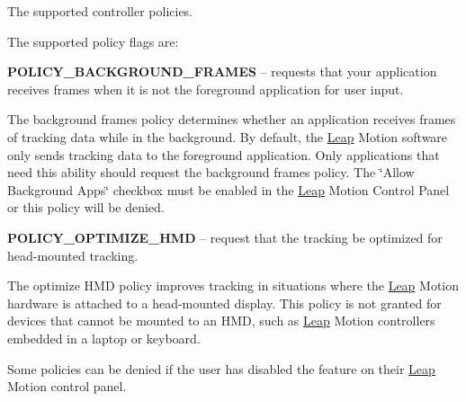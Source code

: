 The supported controller policies. 

The supported policy flags are\+:

{\bfseries{P\+O\+L\+I\+C\+Y\+\_\+\+B\+A\+C\+K\+G\+R\+O\+U\+N\+D\+\_\+\+F\+R\+A\+M\+ES}} -- requests that your application receives frames when it is not the foreground application for user input.

The background frames policy determines whether an application receives frames of tracking data while in the background. By default, the \mbox{\hyperlink{namespace_leap}{Leap}} Motion software only sends tracking data to the foreground application. Only applications that need this ability should request the background frames policy. The \char`\"{}\+Allow Background Apps\char`\"{} checkbox must be enabled in the \mbox{\hyperlink{namespace_leap}{Leap}} Motion Control Panel or this policy will be denied.

{\bfseries{P\+O\+L\+I\+C\+Y\+\_\+\+O\+P\+T\+I\+M\+I\+Z\+E\+\_\+\+H\+MD}} -- request that the tracking be optimized for head-\/mounted tracking.

The optimize H\+MD policy improves tracking in situations where the \mbox{\hyperlink{namespace_leap}{Leap}} Motion hardware is attached to a head-\/mounted display. This policy is not granted for devices that cannot be mounted to an H\+MD, such as \mbox{\hyperlink{namespace_leap}{Leap}} Motion controllers embedded in a laptop or keyboard.

Some policies can be denied if the user has disabled the feature on their \mbox{\hyperlink{namespace_leap}{Leap}} Motion control panel.

